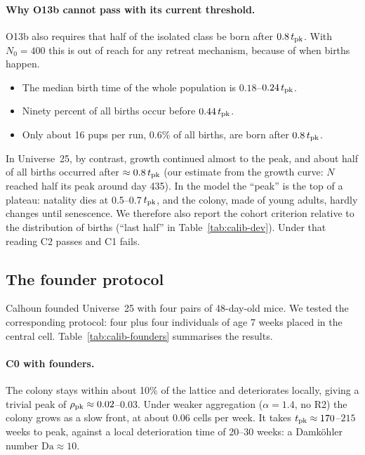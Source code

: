 \paragraph{Why O13b cannot pass with its current threshold.}
O13b also requires that half of the isolated class be born after $0.8\,t_{\rm pk}$. With $N_0=400$ this
is out of reach for any retreat mechanism, because of when births happen.
\begin{itemize}
  \item The median birth time of the whole population is $0.18$--$0.24\,t_{\rm pk}$.
  \item Ninety percent of all births occur before $0.44\,t_{\rm pk}$.
  \item Only about 16 pups per run, 0.6\% of all births, are born after $0.8\,t_{\rm pk}$.
\end{itemize}
In Universe~25, by contrast, growth continued almost to the peak, and about half of all births occurred
after $\approx0.8\,t_{\rm pk}$ (our estimate from the growth curve: $N$ reached half its peak around day 435). In the
model the ``peak'' is the top of a plateau: natality dies at
0.5--0.7\,$t_{\rm pk}$, and the colony, made of young adults, hardly changes until senescence. We
therefore also report the cohort criterion relative to the distribution of births (``last half'' in
Table~\ref{tab:calib-dev}). Under that reading \textsf{C2} passes and \textsf{C1} fails.

\subsection{The founder protocol}
\label{sec:calib-founders}

Calhoun founded Universe~25 with four pairs of 48-day-old mice. We tested the corresponding protocol: four
plus four individuals of age 7 weeks placed in the central cell. Table~\ref{tab:calib-founders}
summarises the results.

\paragraph{\textsf{C0} with founders.}
The colony stays within about 10\% of the lattice and deteriorates locally, giving a trivial peak of
$\rho_{\rm pk}\approx0.02$--$0.03$. Under weaker aggregation ($\alpha=1.4$, no R2) the colony grows as a
slow front, at about $0.06$ cells per week. It takes $t_{\rm pk}\approx170$--$215$ weeks to peak, against
a local deterioration time of 20--30 weeks: a Damköhler number $\mathrm{Da}\approx10$.

